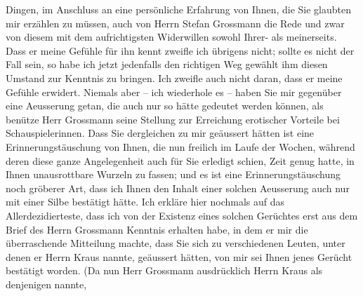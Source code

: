 \begin{ledgroupsized}[t]{13cm}
               Dingen, im Anschluss an eine persönliche Erfahrung von Ihnen, die Sie glaubten mir
               erzählen zu müssen, auch von Herrn Stefan
                  Grossmann die Rede und zwar von diesem mit dem aufrichtigsten Widerwillen
               sowohl Ihrer- als meinerseits. Dass er meine Gefühle für ihn kennt zweifle ich
               übrigens nicht; sollte es nicht der Fall sein, so habe ich jetzt jedenfalls den
               richtigen {\pb}Weg gewählt ihm diesen Umstand zur Kenntnis zu
               bringen. Ich zweifle auch nicht daran, dass er meine Gefühle erwidert. Niemals aber –
               ich wiederhole es – haben Sie mir gegenüber eine Aeusserung getan, die auch nur so
               hätte gedeutet werden können, als benütze Herr Grossmann seine Stellung zur Erreichung erotischer Vorteile bei
               Schauspielerinnen. Dass Sie dergleichen zu mir geäussert hätten ist eine
               Erinnerungstäuschung von Ihnen, die nun freilich im Laufe der Wochen, während deren
               diese ganze Angelegenheit \introOben{}auch\introOben{} für Sie erledigt
               schien, Zeit genug hatte, in Ihnen unausrottbare Wurzeln zu fassen; und es ist eine
               Erinnerungstäuschung noch gröberer Art, dass ich Ihnen den Inhalt einer solchen
               Aeusserung auch nur mit einer Silbe bestätigt hätte. Ich erkläre hier nochmals auf
               das Allerdezidierteste, dass ich von der Existenz eines solchen Gerüchtes erst aus
               dem Brief des Herrn Grossmann Kenntnis erhalten
               habe, in dem er mir die überraschende Mitteilung machte, dass Sie sich zu
               verschiedenen Leuten, unter denen er Herrn Kraus
               nannte, geäussert hätten, von mir sei Ih{\pb}nen jenes Gerücht
               bestätigt worden. (Da nun Herr Grossmann
               ausdrücklich Herrn Kraus als denjenigen nannte,

\end{ledgroupsized}
